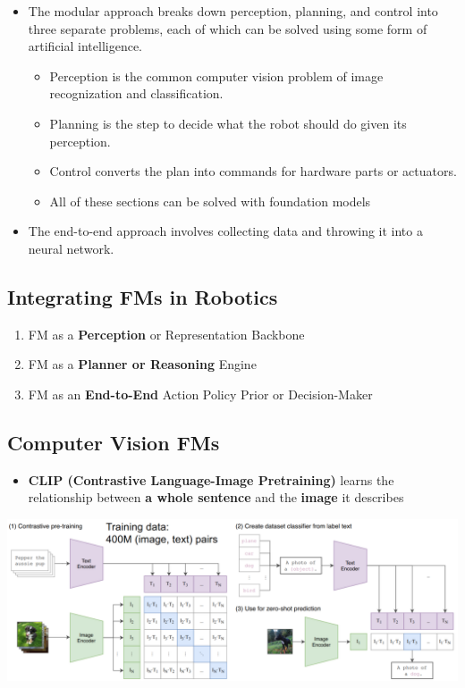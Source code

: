 \documentclass[10pt]{article}
\begin{document}
\begin{itemize}
	\item The modular approach breaks down perception, planning, and control into three separate problems, each of which can be solved using some form of artificial intelligence.  
	\begin{itemize}
        \item Perception is the common computer vision problem of image recognization and classification.
        \item Planning is the step to decide what the robot should do given its perception.
        \item Control converts the plan into commands for hardware parts or actuators.
        \item All of these sections can be solved with foundation models
    \end{itemize}
	\item The end-to-end approach involves collecting data and throwing it into a neural network.
\end{itemize}

\subsection*{Integrating FMs in Robotics}
\begin{enumerate}
    \item FM as a \textbf{Perception} or Representation Backbone
    \item FM as a \textbf{Planner or Reasoning} Engine
    \item FM as an \textbf{End-to-End} Action Policy Prior or Decision-Maker
\end{enumerate}

\subsection*{Computer Vision FMs}
\begin{itemize}
	\item \textbf{CLIP (Contrastive Language-Image Pretraining)} learns the relationship between \textbf{a whole sentence} and the \textbf{image} it describes
\end{itemize}
\begin{center} 
	\includegraphics*[width=\textwidth]{L1_3.png} 
\end{center}
\end{document}
